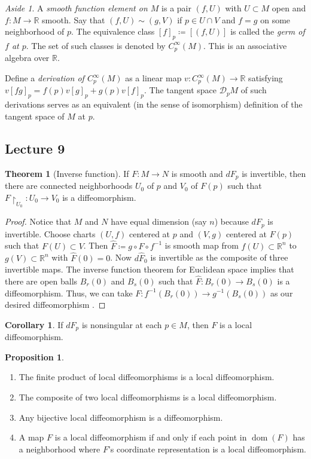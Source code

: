 \documentclass[10pt,letterpaper,cm]{nupset}
\theoremstyle{definition}
\theoremstyle{theorem}
\newtheorem{theorem}[definition]{Theorem}
\newtheorem{prop}[definition]{Proposition}
\newtheorem{corollary}[definition]{Corollary}
\theoremstyle{remark}
\newtheorem*{aside}{Aside}
\newcommand{\R}{\mathbb R}
\newcommand{\1}{\mathbf{1}}
\newcommand{\0}{\vec 0}
\DeclareMathOperator{\dom}{dom}
\begin{document}
\begin{aside}
A \textit{smooth function element on $M$} is a pair $\left(f, U\right)$ with $U\subset M$ open and $f: M \to \R$ smooth. Say that $\left(f, U\right) \sim \left(g, V\right)$ if $p\in U \cap V$ and $f = g$ on some neighborhood of $p$. The equivalence  class $[f]_p \coloneqq \left[(f, U)\right]$ is called the \textit{germ of $f$ at $p$}. The set of such classes is denoted by $C^{\infty}_p(M)$. This is an associative algebra over $\R$. 

 Define a \textit{derivation of $C^{\infty}_p(M)$} as a linear map $v: C^{\infty}_p(M) \to \R$ satisfying $v[fg]_p = f(p)v[g]_p+g(p)v[f]_p$.  The tangent space $\mathcal{D}_pM$ of such derivations serves as an equivalent (in the sense of isomorphism) definition of the tangent space of $M$ at $p$.
\end{aside}

\subsection{Lecture 9}

\begin{theorem}[Inverse function]
If $F: M \to N$ is smooth and $dF_p$ is invertible, then there are connected neighborhoods  $U_0$ of $p$ and $V_0$ of $F(p)$ such that $F\restriction_{U_0}: U_0 \to V_0$ is a diffeomorphism.
\end{theorem}
\begin{proof}
Notice that $M$ and $N$ have equal dimension (say $n$) because $dF_p$ is invertible. Choose charts $\left(U, f\right)$ centered at $p$ and $\left(V, g\right)$ centered at $F(p)$ such that $F(U) \subset V$. Then $\widehat{F}\coloneqq  g \circ F \circ f^{-1}$ is smooth map from $ f(U)\subset \R^n$ to $ g(V)\subset \R^n$ with $\widehat{F}(0) =0$. Now $d\widehat{F}_0$ is invertible as the composite of three invertible maps. The inverse function theorem for Euclidean space implies that there are open balls $B_{r}(0)$ and $B_s(0)$ such that $\widehat{F} : B_r(0) \to B_s(0)$ is a diffeomorphism. Thus, we can take $F: f^{-1}(B_r(0)) \to g^{-1}(B_s(0))$ as our desired diffeomorphism .
\end{proof}

\begin{corollary}
If $dF_p$ is nonsingular at each $p\in M$, then $F$ is a local diffeomorphism.
\end{corollary}

\begin{prop} $ $
\begin{enumerate}
\item The finite product of local diffeomorphisms is a local diffeomorphism.
\item The composite of two local diffeomorphisms is a local diffeomorphism.
\item Any bijective local diffeomorphism is a diffeomorphism.
\item A map $F$ is a local diffeomorphism if and only if each point in $\dom(F)$ has a neighborhood where $F$'s coordinate representation is a local diffeomorphism.
\end{enumerate}
\end{prop}
\end{document}
